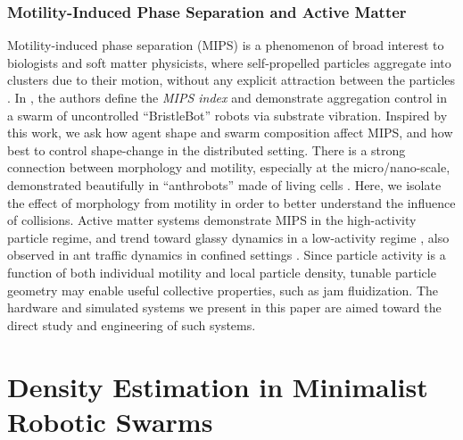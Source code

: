 \documentclass[runningheads]{llncs}
\begin{document}
\subsubsection{Motility-Induced Phase Separation and Active Matter} Motility-induced phase separation (MIPS) is a phenomenon of broad interest to biologists and soft matter physicists, where self-propelled particles aggregate into clusters due to their motion, without any explicit attraction between the particles \cite{gonnella2015motility}. In \cite{hao2022controlling}, the authors define the \emph{MIPS index} and demonstrate aggregation control in a swarm of uncontrolled ``BristleBot'' robots via substrate vibration. Inspired by this work, we ask how agent shape and swarm composition affect MIPS, and how best to control shape-change in the distributed setting. There is a strong connection between morphology and motility, especially at the micro/nano-scale, demonstrated beautifully in ``anthrobots'' made of living cells \cite{gumuskaya2024motile}. Here, we isolate the effect of morphology from motility in order to better understand the influence of collisions. Active matter systems demonstrate MIPS in the high-activity particle regime, and trend toward glassy dynamics in a low-activity regime \cite{paoluzzi2022motility}, also observed in ant traffic dynamics in confined settings \cite{gravish2015glass}. Since particle activity is a function of both individual motility and local particle density, tunable particle geometry may enable useful collective properties, such as jam fluidization. The hardware and simulated systems we present in this paper are aimed toward the direct study and engineering of such systems.






\section{Density Estimation in Minimalist Robotic Swarms}
\end{document}
